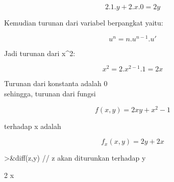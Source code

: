 \documentclass[a4paper,10pt]{article}
\begin{document}
\begin{eulernotebook}
\begin{eulercomment}
\begin{eulercomment}
\begin{eulercomment}
\begin{eulercomment}
\begin{eulercomment}
\begin{eulercomment}
\begin{eulercomment}
\begin{eulercomment}
\begin{eulercomment}
\begin{eulercomment}
\begin{eulercomment}
\begin{eulercomment}
\begin{eulercomment}
\begin{eulercomment}
\begin{eulercomment}
\begin{eulercomment}
\begin{eulercomment}
\begin{eulercomment}
\begin{eulercomment}
\begin{eulercomment}
\begin{eulercomment}
\begin{eulercomment}
\begin{eulercomment}
\begin{eulercomment}
\begin{eulercomment}
\begin{eulercomment}
\begin{eulercomment}
\begin{eulercomment}
\begin{eulercomment}
\begin{eulercomment}
\begin{eulercomment}
\end{eulercomment}
\begin{eulerformula}
\[
2.1.y+2.x.0=2y
\]
\end{eulerformula}
\begin{eulercomment}
Kemudian turunan dari variabel berpangkat yaitu:\\
\end{eulercomment}
\begin{eulerformula}
\[
u^n=n.u^{n-1}.u'
\]
\end{eulerformula}
\begin{eulercomment}
Jadi turunan dari x\textasciicircum{}2:\\
\end{eulercomment}
\begin{eulerformula}
\[
x^2=2.x^{2-1}.1=2x
\]
\end{eulerformula}
\begin{eulercomment}
Turunan dari konstanta adalah 0\\
sehingga, turunan dari fungsi\\
\end{eulercomment}
\begin{eulerformula}
\[
f(x,y)=2xy+x^2-1
\]
\end{eulerformula}
\begin{eulercomment}
terhadap x adalah\\
\end{eulercomment}
\begin{eulerformula}
\[
f_x(x,y)=2y+2x
\]
\end{eulerformula}
\begin{eulercomment}
\end{eulercomment}
\begin{eulerprompt}
>&diff(z,y) // z akan diturunkan terhadap y
\end{eulerprompt}
\begin{euleroutput}
  
                                   2 x
  

\end{euleroutput}
\end{eulercomment}
\end{eulercomment}
\end{eulercomment}
\end{eulercomment}
\end{eulercomment}
\end{eulercomment}
\end{eulercomment}
\end{eulercomment}
\end{eulercomment}
\end{eulercomment}
\end{eulercomment}
\end{eulercomment}
\end{eulercomment}
\end{eulercomment}
\end{eulercomment}
\end{eulercomment}
\end{eulercomment}
\end{eulercomment}
\end{eulercomment}
\end{eulercomment}
\end{eulercomment}
\end{eulercomment}
\end{eulercomment}
\end{eulercomment}
\end{eulercomment}
\end{eulercomment}
\end{eulercomment}
\end{eulercomment}
\end{eulercomment}
\end{eulercomment}
\end{eulernotebook}
\end{document}
